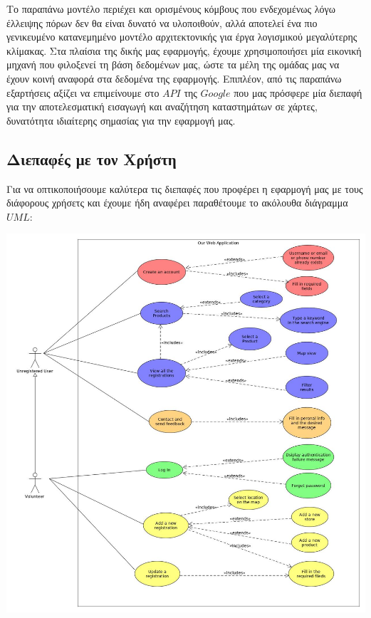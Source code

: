 \documentclass[12pt]{article}
\begin{document}
Το παραπάνω μοντέλο περιέχει και ορισμένους κόμβους που ενδεχομένως λόγω έλλειψης πόρων δεν θα είναι δυνατό να υλοποιθούν, αλλά αποτελεί ένα πιο γενικευμένο κατανεμημένο μοντέλο αρχιτεκτονικής για έργα λογισμικού μεγαλύτερης κλίμακας. Στα πλαίσια της δικής μας εφαρμογής, έχουμε χρησιμοποιήσει μία εικονική μηχανή που φιλοξενεί τη βάση δεδομένων μας, ώστε τα μέλη της ομάδας μας να έχουν κοινή αναφορά στα δεδομένα της εφαρμογής. Επιπλέον, από τις παραπάνω εξαρτήσεις αξίζει να επιμείνουμε στο $API$ της $Google$ που μας πρόσφερε μία διεπαφή για την αποτελεσματική εισαγωγή και αναζήτηση καταστημάτων σε χάρτες, δυνατότητα ιδιαίτερης σημασίας για την εφαρμογή μας.

\subsection{Διεπαφές με τον Χρήστη}

Για να οπτικοποιήσουμε καλύτερα τις διεπαφές που προφέρει η εφαρμογή μας με τους διάφορους χρήσετς και έχουμε ήδη αναφέρει παραθέτουμε το ακόλουθα διάγραμμα $UML$:

\begin{center}

\includegraphics[scale=0.35]{UML/useCaseDiagram.jpg}

\end{center}
\end{document}

